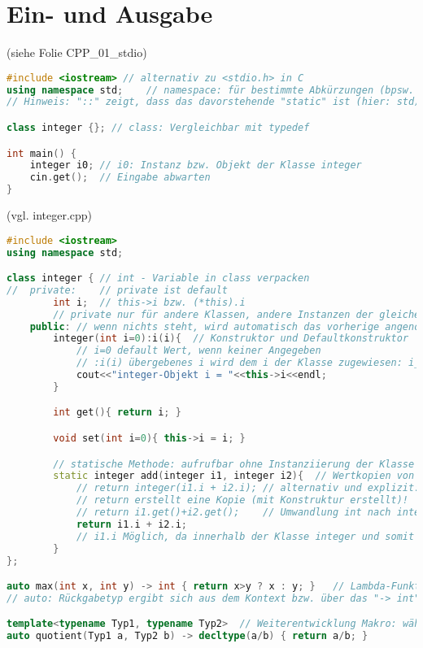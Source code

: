 \section{Ein- und Ausgabe}
(siehe Folie CPP\_01\_stdio)
\begin{lstlisting}[language=C++]
#include <iostream>	// alternativ zu <stdio.h> in C
using namespace std;	// namespace: für bestimmte Abkürzungen (bpsw. cout anstatt std::cout)
// Hinweis: "::" zeigt, dass das davorstehende "static" ist (hier: std)

class integer {}; // class: Vergleichbar mit typedef

int main() {
	integer i0;	// i0: Instanz bzw. Objekt der Klasse integer
	cin.get();	// Eingabe abwarten
}
\end{lstlisting}
(vgl. integer.cpp)
\begin{lstlisting}[language=C++]
#include <iostream>
using namespace std;

class integer { // int - Variable in class verpacken
//	private:    // private ist default
		int i;  // this->i bzw. (*this).i
		// private nur für andere Klassen, andere Instanzen der gleichen Klasse können drauf zugreifen
	public: // wenn nichts steht, wird automatisch das vorherige angenommen. Hier: private
		integer(int i=0):i(i){  // Konstruktor und Defaultkonstruktor
			// i=0 default Wert, wenn keiner Angegeben
			// :i(i) übergebenes i wird dem i der Klasse zugewiesen: i_1(i_2) i_1 ist this->i, und i_2 ist das übergebene i
			cout<<"integer-Objekt i = "<<this->i<<endl; 
		}

		int get(){ return i; }

		void set(int i=0){ this->i = i; }

		// statische Methode: aufrufbar ohne Instanziierung der Klasse
		static integer add(integer i1, integer i2){  // Wertkopien von i1 und i2
			// return integer(i1.i + i2.i); // alternativ und explizit: Konstruktor-Aufruf
			// return erstellt eine Kopie (mit Konstruktur erstellt)!
			// return i1.get()+i2.get();    // Umwandlung int nach integer, Aufruf Konstruktor implizit
			return i1.i + i2.i;
			// i1.i Möglich, da innerhalb der Klasse integer und somit privates i sichtbar
		}
};

auto max(int x, int y) -> int { return x>y ? x : y; }	// Lambda-Funktion
// auto: Rückgabetyp ergibt sich aus dem Kontext bzw. über das "-> int"

template<typename Typ1, typename Typ2>	// Weiterentwicklung Makro: wählt automatisch Typ aus
auto quotient(Typ1 a, Typ2 b) -> decltype(a/b) { return a/b; }


\end{lstlisting}
